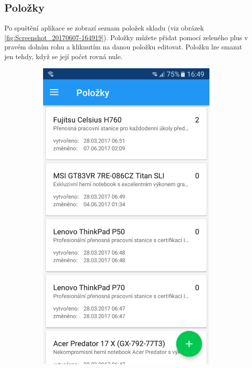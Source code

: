 \documentclass[czech,BP]{thesiskiv}
\begin{document}
\subsection{Položky}	
Po spuštění aplikace se zobrazí seznam položek skladu (viz obrázek \ref{fig:Screenshot_20170607-164919}).
Položky můžete přidat pomocí zeleného plus v pravém dolním rohu a kliknutím na danou položku editovat.
Položku lze smazat jen tehdy, když se její počet rovná nule.
\begin{figure}[H]
	\centering
  \begin{subfigure}[b]{0.3\textwidth}
    \centering
	\includegraphics[width=\textwidth]{../images/client_android/Screenshot_20170607-164919.png}	

\end{subfigure}
\end{figure}
\end{document}

